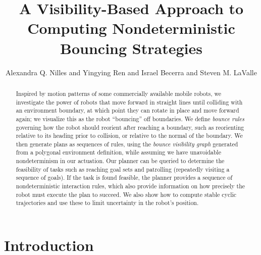 \documentclass[sageh,times,Review]{sagej}
\begin{document}

\title{A Visibility-Based Approach to Computing Nondeterministic Bouncing Strategies}

\author{Alexandra Q. Nilles and
Yingying Ren and
Israel Becerra and
Steven M. LaValle}




\begin{abstract}
Inspired by motion patterns of some commercially available mobile robots, we
investigate the power of robots that move forward in straight lines until
colliding with an environment boundary, at which point they can rotate in place
and move forward again; we visualize this as the robot ``bouncing'' off
boundaries. We define {\em bounce rules} governing how the robot should reorient
after reaching a boundary, such as reorienting relative to its heading prior to 
collision, or relative to the normal of the boundary. We then generate plans as sequences of rules, using the
{\em bounce visibility graph} generated from a polygonal environment definition,
while assuming we have unavoidable nondeterminism in our actuation. Our planner
can be queried to determine the feasibility of tasks such as reaching goal sets
and patrolling (repeatedly visiting a sequence of goals). If the task is
found feasible, the planner provides a sequence of nondeterministic interaction rules,
which also provide information on how precisely the robot must execute the plan
to succeed. We also show how to compute stable cyclic trajectories and use these
to limit uncertainty in the robot's position.
\end{abstract}


\maketitle


\section{Introduction}
\end{document}
